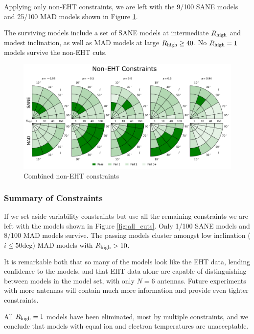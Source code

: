 
Applying only non-EHT constraints, we are left with the 9/100 SANE models and 25/100 MAD models shown in Figure \ref{fig:non_eht_cuts}.

The surviving models include a set of SANE models at intermediate $R_\mathrm{high}$ and modest inclination, as well as MAD models at large $R_\mathrm{high} \ge 40$.  No $R_\mathrm{high} = 1$ models survive the non-EHT cuts.

\begin{figure}
  \centering
  \includegraphics[width=\columnwidth]{./figures/Non_Interferometric_Constraints.png}
  \caption{Combined non-EHT constraints}
  \label{fig:non_eht_cuts}
\end{figure}

\subsubsection{Summary of Constraints}

If we set aside variability constraints but use all the remaining constraints we are left with the models shown in Figure \ref{fig:all_cuts}.  Only 1/100 SANE models and 8/100 MAD models survive. The passing models cluster amongst low inclination ($i \le 50$deg) MAD models with $R_\mathrm{high} > 10$.

It is remarkable both that so many of the models look like the EHT data, lending confidence to the models, and that EHT data alone are capable of distinguishing between models in the model set, with only $N = 6$ antennas.  Future experiments with more antennas will contain much more information and provide even tighter constraints.

All $R_\mathrm{high} = 1$ models have been eliminated, most by multiple constraints, and we conclude that models with equal ion and electron temperatures are unacceptable.

